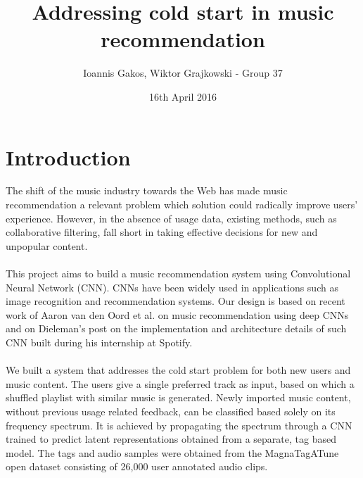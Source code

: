 \documentclass[11pt, a4paper]{article}
\begin{document}
  \title{Addressing cold start in music recommendation}
  \author{Ioannis Gakos, Wiktor Grajkowski - Group 37}
  \date{16th April 2016}
  \maketitle

  \section{Introduction}
    The shift of the music industry towards the Web has made music
    recommendation a relevant problem which solution could radically improve
    users' experience. However, in the absence of usage data, existing methods,
    such as collaborative filtering, fall short in taking effective decisions
    for new and unpopular content.
    \\ \\
    \noindent
    This project aims to build a music recommendation system using
    Convolutional Neural Network (CNN). CNNs have been widely used in
    applications such as image recognition and recommendation systems. Our
    design is based on recent work of Aaron van den Oord et al. on music
    recommendation \cite{deep-content-based-music-recommendation} using deep
    CNNs and on Dieleman's post \cite{spotify-dieleman} on the implementation
    and architecture details of such CNN built during his internship at
    Spotify.
    \\ \\
    \noindent
    We built a system that addresses the cold start problem for both new users
    and music content. The users give a single preferred track as input, based
    on which a shuffled playlist with similar music is generated. Newly
    imported music content, without previous usage related feedback, can be
    classified based solely on its frequency spectrum. It is achieved by
    propagating the spectrum through a CNN trained to predict latent
    representations obtained from a separate, tag based model. The tags and
    audio samples were obtained from the MagnaTagATune open dataset consisting
    of 26,000 user annotated audio clips.
\end{document}
